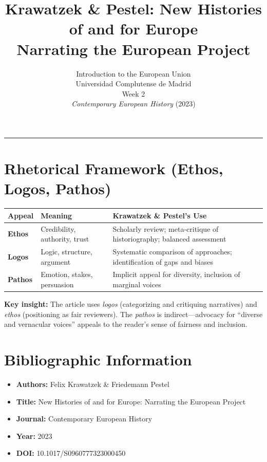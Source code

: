 \documentclass[11pt,a4paper]{article}
\begin{document}
\title{Krawatzek \& Pestel: New Histories of and for Europe\\Narrating the European Project}
\author{Introduction to the European Union\\Universidad Complutense de Madrid\\Week 2\\\textit{Contemporary European History} (2023)}
\date{}
\maketitle
\vspace{-1em}
\hrule
\vspace{1em}

\section*{Rhetorical Framework (Ethos, Logos, Pathos)}

\begin{table}[h]
\centering
\begin{tabular}{@{}lll@{}}
\toprule
\textbf{Appeal} & \textbf{Meaning} & \textbf{Krawatzek \& Pestel's Use} \\
\midrule
\textbf{Ethos} & Credibility, authority, trust & Scholarly review; meta-critique of historiography; balanced assessment \\
\textbf{Logos} & Logic, structure, argument & Systematic comparison of approaches; identification of gaps and biases \\
\textbf{Pathos} & Emotion, stakes, persuasion & Implicit appeal for diversity, inclusion of marginal voices \\
\bottomrule
\end{tabular}
\end{table}

\textbf{Key insight:} The article uses \textit{logos} (categorizing and critiquing narratives) and \textit{ethos} (positioning as fair reviewers). The \textit{pathos} is indirect---advocacy for ``diverse and vernacular voices'' appeals to the reader's sense of fairness and inclusion.

\section*{Bibliographic Information}

\begin{itemize}
\item \textbf{Authors:} Felix Krawatzek \& Friedemann Pestel
\item \textbf{Title:} New Histories of and for Europe: Narrating the European Project
\item \textbf{Journal:} Contemporary European History
\item \textbf{Year:} 2023
\item \textbf{DOI:} 10.1017/S0960777323000450
\end{itemize}
\end{document}
